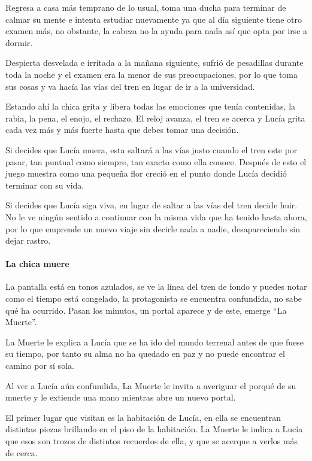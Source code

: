 Regresa a casa más temprano de lo usual, toma una ducha para terminar de calmar su mente e intenta estudiar nuevamente ya que al día siguiente tiene otro examen más, no obstante, la cabeza no la ayuda para nada así que opta por irse a dormir.

Despierta desvelada e irritada a la mañana siguiente, sufrió de pesadillas durante toda la noche y el examen era la menor de sus preocupaciones, por lo que toma sus cosas y va hacía las vías del tren en lugar de ir a la universidad.

Estando ahí la chica grita y libera todas las emociones que tenía contenidas, la rabia, la pena, el enojo, el rechazo. El reloj avanza, el tren se acerca y Lucía grita cada vez más y más fuerte hasta que debes tomar una decisión.

Si decides que Lucía muera, esta saltará a las vías justo cuando el tren este por pasar, tan puntual como siempre, tan exacto como ella conoce. Después de esto el juego muestra como una pequeña flor creció en el punto donde Lucía decidió terminar con su vida.

Si decides que Lucía siga viva, en lugar de saltar a las vías del tren decide huir. No le ve ningún sentido a continuar con la misma vida que ha tenido hasta ahora, por lo que emprende un nuevo viaje sin decirle nada a nadie, desapareciendo sin dejar rastro.

\paragraph{La chica muere}
La pantalla está en tonos azulados, se ve la línea del tren de fondo y puedes notar como el tiempo está congelado, la protagonista se encuentra confundida, no sabe qué ha ocurrido. Pasan los minutos, un portal aparece y de este, emerge ``La Muerte''.

La Muerte le explica a Lucía que se ha ido del mundo terrenal antes de que fuese su tiempo, por tanto su alma no ha quedado en paz y no puede encontrar el camino por sí sola.

Al ver a Lucía aún confundida, La Muerte le invita a averiguar el porqué de su muerte y le extiende una mano mientras abre un nuevo portal. 

El primer lugar que visitan es la habitación de Lucía, en ella se encuentran distintas piezas brillando en el piso de la habitación. La Muerte le indica a Lucía que esos son trozos de distintos recuerdos de ella, y que se acerque a verlos más de cerca. 


